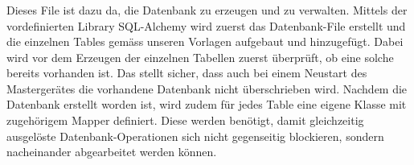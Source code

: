 \subsubsection{}
\label{subsubsec:software:master:implementation:database}

Dieses File ist  dazu da, die Datenbank zu erzeugen  und zu verwalten. Mittels
der  vordefinierten   Library  SQL-Alchemy  wird  zuerst   das  Datenbank-File
erstellt  und die  einzelnen Tables  gem\"ass unseren  Vorlagen aufgebaut  und
hinzugef\"ugt. Dabei  wird  vor dem  Erzeugen  der  einzelnen Tabellen  zuerst
\"uberpr\"uft, ob eine  solche bereits vorhanden ist. Das  stellt sicher, dass
auch bei  einem Neustart  des Masterger\"ates  die vorhandene  Datenbank nicht
\"uberschrieben wird. Nachdem  die Datenbank  erstellt worden ist,  wird zudem
f\"ur jedes Table eine eigene Klasse mit zugeh\"origem Mapper definiert. Diese
werden  ben\"otigt,  damit   gleichzeitig  ausgel\"oste  Datenbank-Operationen
sich nicht  gegenseitig blockieren,  sondern nacheinander  abgearbeitet werden
k\"onnen.


